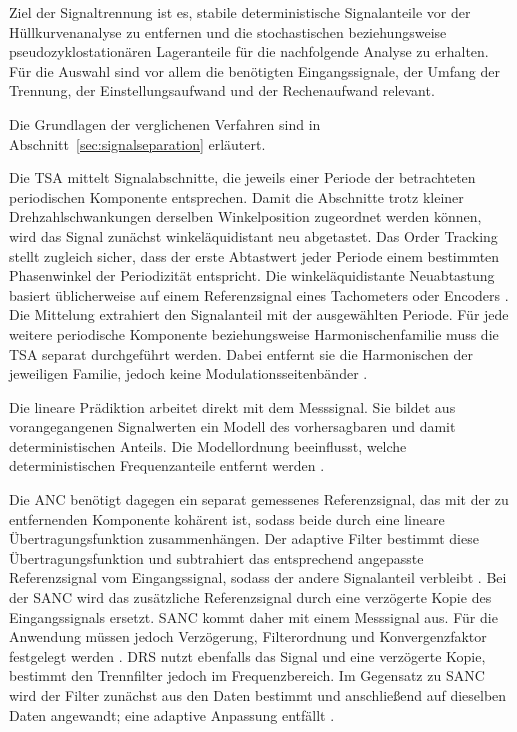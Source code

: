 
Ziel der Signaltrennung ist es, stabile deterministische Signalanteile vor der
Hüllkurvenanalyse zu entfernen und die stochastischen beziehungsweise
pseudo\-zyklo\-stationären Lageranteile für die nachfolgende Analyse zu
erhalten. Für die Auswahl sind vor allem die benötigten Eingangssignale, der
Umfang der Trennung, der Einstellungsaufwand und der Rechenaufwand relevant.

Die Grundlagen der verglichenen Verfahren sind in
Abschnitt~\ref{sec:signalseparation} erläutert.

Die \gls{TSA} mittelt Signalabschnitte, die jeweils einer Periode der
betrachteten periodischen Komponente entsprechen. Damit die Abschnitte trotz
kleiner Drehzahlschwankungen derselben Winkelposition zugeordnet werden können,
wird das Signal zunächst winkeläquidistant neu abgetastet. Das Order Tracking
stellt zugleich sicher, dass der erste Abtastwert
jeder Periode einem bestimmten Phasenwinkel der Periodizität entspricht. Die
winkeläquidistante Neuabtastung basiert üblicherweise auf einem Referenzsignal
eines Tachometers oder Encoders
\cite[S.~11--12, Abschn.~2]
{randallComparisonMethodsSeparation2011}.
Die Mittelung extrahiert den Signalanteil mit der ausgewählten Periode. Für
jede weitere periodische Komponente beziehungsweise Harmonischenfamilie muss
die TSA separat durchgeführt werden. Dabei entfernt sie die Harmonischen der
jeweiligen Familie, jedoch keine Modulationsseitenbänder
\cite[S.~11, Abschn.~2; S.~18, Abschn.~7]
{randallComparisonMethodsSeparation2011}.

Die lineare Prädiktion arbeitet direkt mit dem Messsignal. Sie bildet aus
vorangegangenen Signalwerten ein Modell des vorhersagbaren und damit
deterministischen Anteils. Die Modellordnung beeinflusst, welche
deterministischen Frequenzanteile entfernt werden
\cite[S.~13--14, Abschn.~3]
{randallComparisonMethodsSeparation2011}.

Die \gls{ANC} benötigt dagegen ein separat gemessenes Referenzsignal, das mit
der zu entfernenden Komponente kohärent ist, sodass beide durch eine lineare
Übertragungsfunktion zusammenhängen. Der adaptive Filter bestimmt diese
Übertragungsfunktion und subtrahiert das entsprechend angepasste
Referenzsignal vom Eingangssignal, sodass der andere Signalanteil verbleibt
\cite[S.~183, Abschn.~5.3.3]
{randallVibrationbasedConditionMonitoring2022}.
Bei der \gls{SANC} wird das zusätzliche Referenzsignal durch eine verzögerte
Kopie des Eingangssignals ersetzt. SANC kommt daher mit einem Messsignal aus.
Für die Anwendung müssen jedoch Verzögerung, Filterordnung und
Konvergenzfaktor festgelegt werden
\cite[S.~184--185, Abschn.~5.3.4]
{randallVibrationbasedConditionMonitoring2022}.
\gls{DRS} nutzt ebenfalls das Signal und eine verzögerte Kopie, bestimmt den
Trennfilter jedoch im Frequenzbereich. Im Gegensatz zu SANC wird der Filter
zunächst aus den Daten bestimmt und anschließend auf dieselben Daten
angewandt; eine adaptive Anpassung entfällt
\cite[S.~185--186, Abschn.~5.3.5]
{randallVibrationbasedConditionMonitoring2022}.

